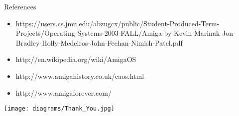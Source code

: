 \documentclass{beamer}
\begin{document}
\begin{frame}{References}
  \begin{itemize}
  	\item https://users.cs.jmu.edu/abzugcx/public/Student-Produced-Term-Projects/Operating-Systems-2003-FALL/Amiga-by-Kevin-Marinak-Jon-Bradley-Holly-Medeiros-John-Feehan-Nimish-Patel.pdf
\item http://en.wikipedia.org/wiki/AmigaOS
\item http://www.amigahistory.co.uk/caos.html
\item http://www.amigaforever.com/
\end{itemize}
\end{frame}


\begin{frame}{}
 
  \begin{center}
    \texttt{[image: diagrams/Thank\_You.jpg]}
  \end{center}
\end{frame}
\end{document}
